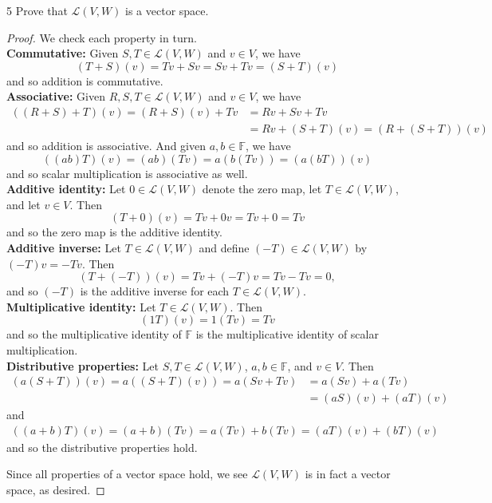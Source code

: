 \documentclass{extarticle}
\newenvironment{problem}[1]{\begin{prob*}{#1}{}}{\end{prob*}}
\newcommand{\F}{\mathbb{F}}
\newcommand{\Hom}{\mathcal{L}}
\begin{document}
\begin{problem}{5}
Prove that $\Hom(V,W)$ is a vector space.
\end{problem}
\begin{proof}
We check each property in turn.\\
\textbf{Commutative:}  Given $S,T\in\Hom(V,W)$ and $v\in V$, we have 
\begin{equation*}
(T+S)(v) = Tv + Sv = Sv + Tv = (S + T)(v)
\end{equation*} 
and so addition is commutative.\\
\textbf{Associative:} Given $R,S,T\in\Hom(V,W)$ and $v\in V$, we have 
\begin{align*}
((R + S) + T)(v) = (R+S)(v) + Tv &= Rv + Sv + Tv\\
&= Rv + (S + T)(v) = (R + (S + T))(v)
\end{align*}
and so addition is associative.  And given $a,b\in\F$, we have
\begin{equation*}
((ab)T)(v) = (ab)(Tv) = a(b(Tv)) = (a(bT))(v)
\end{equation*}
and so scalar multiplication is associative as well.\\
\textbf{Additive identity:} Let $0\in\Hom(V,W)$ denote the zero map, let $T\in\Hom(V,W)$, and let $v\in V$.  Then 
\begin{equation*}
(T + 0)(v) = Tv + 0v = Tv + 0 = Tv
\end{equation*}
and so the zero map is the additive identity.\\
\textbf{Additive inverse:} Let $T\in\Hom(V,W)$ and define $(-T)\in\Hom(V,W)$ by $(-T)v = -Tv$.  Then
\begin{equation*}
(T + (-T))(v) = Tv + (-T)v = Tv - Tv = 0,
\end{equation*}
and so $(-T)$ is the additive inverse for each $T\in\Hom(V,W)$.\\
\textbf{Multiplicative identity:}  Let $T\in\Hom(V,W)$.  Then
\begin{equation*}
(1T)(v) = 1(Tv) = Tv
\end{equation*}
and so the multiplicative identity of $\F$ is the multiplicative identity of scalar multiplication.\\
\textbf{Distributive properties:}  Let $S,T\in\Hom(V,W)$, $a,b\in\F$, and $v\in V$.  Then 
\begin{align*}
(a(S + T))(v) = a((S + T)(v)) = a(Sv + Tv) &= a(Sv) + a(Tv)\\
 & = (aS)(v) + (aT)(v)
\end{align*}
and
\begin{align*}
((a + b)T)(v) = (a+b)(Tv) = a(Tv) + b(Tv) = (aT)(v) + (bT)(v)
\end{align*}
and so the distributive properties hold.
\par Since all properties of a vector space hold, we see $\Hom(V,W)$ is in fact a vector space, as desired.
\end{proof}
\end{document}
